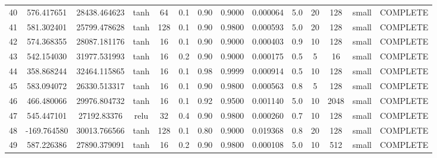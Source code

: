 \begin{longtable}{cccccccccccccc}
                       40 &                 576.417651 &                       28438.464623 &            tanh &          64 &         0.1 &        0.90 & 0.9000 &       0.000064 &             5.0 &        20 &      128 &     small & COMPLETE \\
                       41 &                 581.302401 &                       25799.478628 &            tanh &         128 &         0.1 &        0.90 & 0.9800 &       0.000593 &             5.0 &        20 &      128 &     small & COMPLETE \\
                       42 &                 574.368355 &                       28087.181176 &            tanh &          16 &         0.1 &        0.90 & 0.9000 &       0.000403 &             0.9 &        10 &      128 &     small & COMPLETE \\
                       43 &                 542.154030 &                       31977.531993 &            tanh &          16 &         0.2 &        0.90 & 0.9000 &       0.000175 &             0.5 &         5 &       16 &     small & COMPLETE \\
                       44 &                 358.868244 &                       32464.115865 &            tanh &          16 &         0.1 &        0.98 & 0.9999 &       0.000914 &             0.5 &        10 &      128 &     small & COMPLETE \\
                       45 &                 583.094072 &                       26330.513317 &            tanh &          16 &         0.1 &        0.90 & 0.9800 &       0.000563 &             0.8 &         5 &      128 &     small & COMPLETE \\
                       46 &                 466.480066 &                       29976.804732 &            tanh &          16 &         0.1 &        0.92 & 0.9500 &       0.001140 &             5.0 &        10 &     2048 &     small & COMPLETE \\
                       47 &                 545.447101 &                        27192.83376 &            relu &          32 &         0.4 &        0.90 & 0.9800 &       0.000260 &             0.7 &        10 &      128 &     small & COMPLETE \\
                       48 &                -169.764580 &                       30013.766566 &            tanh &         128 &         0.1 &        0.80 & 0.9000 &       0.019368 &             0.8 &        20 &      128 &     small & COMPLETE \\
                       49 &                 587.226386 &                       27890.379091 &            tanh &          16 &         0.2 &        0.90 & 0.9800 &       0.000108 &             5.0 &        10 &      512 &     small & COMPLETE \\

\end{longtable}
